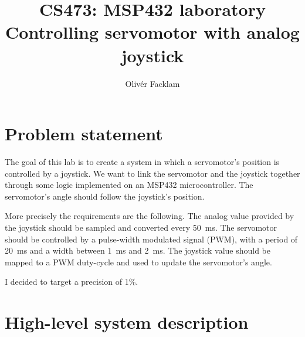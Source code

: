 \documentclass[12pt,a4paper]{article}
\author{Olivér Facklam}
\title{CS473: MSP432 laboratory\\Controlling servomotor with analog joystick}
\begin{document}
\maketitle
\tableofcontents

\section{Problem statement}

The goal of this lab is to create a system in which a servomotor's position is controlled by a joystick. We want to link the servomotor and the joystick together through some logic implemented on an MSP432 microcontroller. The servomotor's angle should follow the joystick's position.

More precisely the requirements are the following. The analog value provided by the joystick should be sampled and converted every \SI{50}{\milli\s}. The servomotor should be controlled by a pulse-width modulated signal (PWM), with a period of \SI{20}{\milli\s} and a width between \SI{1}{\milli\s} and \SI{2}{\milli\s}. The joystick value should be mapped to a PWM duty-cycle and used to update the servomotor's angle.

I decided to target a precision of 1\%.

\section{High-level system description}
\end{document}
